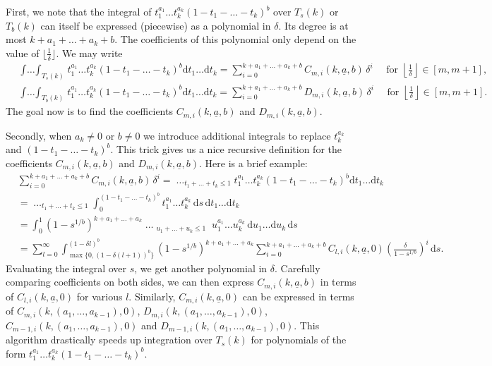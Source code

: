 \documentclass{amsart}
\numberwithin{equation}{section}
\begin{document}
\medskip  
 First, we note that the integral of $ t_1^{a_1} \dots t_k^{a_k} (1-t_1-\dots-t_k)^b$ over $T_s(k)$  or $T_b(k)$ can itself be expressed (piecewise) as a polynomial in $\delta$. Its degree is at most $k+a_1+\dots+a_k+b$. The coefficients of this polynomial only depend on the value of $\lfloor \frac{1}{\delta} \rfloor$. We may write
 \begin{align*}
 &\mathop{\int \dots \int }_{T_s (k)}    t_1^{a_1} \dots t_k^{a_k} (1-t_1-\dots-t_k)^b \mbox{d}t_1 \dots  \mbox{d}t_k = \sum_{i=0}^{k+a_1+\dots+a_k+b} C_{m,i}(k,\underline{a},b) \,\delta^i \quad \mbox{ for }  \left\lfloor \frac{1}{\delta} \right\rfloor \in [m,m+1], \\ 
  &\mathop{\int \dots \int }_{T_b (k)}    t_1^{a_1} \dots t_k^{a_k} (1-t_1-\dots-t_k)^b \mbox{d}t_1 \dots  \mbox{d}t_k = \sum_{i=0}^{k+a_1+\dots+a_k+b} D_{m,i}(k,\underline{a},b) \,\delta^i \quad \mbox{ for }  \left\lfloor \frac{1}{\delta} \right\rfloor \in [m,m+1].
 \end{align*}
 The goal  now is to find the coefficients $C_{m,i}(k,\underline{a},b)$ and $D_{m,i}(k,\underline{a},b)$. 
 
\medskip  
  Secondly, when $a_k \neq 0$ or $b \neq 0$  
 we introduce additional integrals to replace $t_k^{a_k}$ and $(1-t_1-\dots-t_k)^b$. This trick gives us  a nice recursive definition for the coefficients $C_{m,i}(k,\underline{a},b)$ and $D_{m,i}(k,\underline{a},b)$. Here is a brief example:
 \begin{align*}
 &\sum_{i=0}^{k+a_1+\dots+a_k+b} C_{m,i}(k,\underline{a},b) \, \delta^i  =\mathop{\int_0^\delta \dots \int_0^\delta}_{t_1 + \dots + t_k \leq 1}   t_1^{a_1} \dots t_k^{a_k} (1-t_1-\dots-t_k)^b \mbox{d}t_1 \dots  \mbox{d}t_k \\
 &= 
 \mathop{\int_0^\delta \dots \int_0^\delta}_{t_1 + \dots + t_k \leq 1} \int_{0}^{(1-t_1-\dots-t_k)^b}   t_1^{a_1} \dots t_{k}^{a_{k}}  \, \mbox{d}s \, \mbox{d}t_1 \dots  \mbox{d}t_k\\
 &= 
\int_{0}^{1}  (1 -s^{1/b} )^{k+ a_1+\dots + a_k} \mathop{\int_0^{\frac{\delta}{1 -s^{1/b} }}  \dots \int_0^{\frac{\delta}{1 -s^{1/b} }}}_{\substack{ u_1 + \dots + u_k \leq 1    }}   u_1^{a_1} \dots u_{k}^{a_{k}} \, \mbox{d}u_1 \dots  \mbox{d}u_k \, \mbox{d}s \\
&= \sum_{l=0}^\infty 
\int_{\max\{0,(1-\delta (l+1))^b\}}^{(1-\delta l)^b}  (1 -s^{1/b} )^{k+ a_1+\dots + a_k}   \sum_{i=0}^{k+a_1+\dots+a_k+b} C_{l,i}(k,\underline{a},0)\left(\frac{\delta}{1-s^{1/b}}\right)^i\, \mbox{d}s.
 \end{align*}
 Evaluating the integral over $s$, we get another polynomial in $\delta$. Carefully comparing coefficients on both sides, we can then express $C_{m,i}(k,\underline{a},b)$ in terms of $C_{l,i}(k,\underline{a},0)$ for various $l$. Similarly, $C_{m,i}(k,\underline{a},0)$ can be expressed in terms of $C_{m,i}(k,(a_1, \dots, a_{k-1}),0)$, $D_{m,i}(k,(a_1, \dots, a_{k-1}),0)$, $C_{m-1,i}(k,(a_1, \dots, a_{k-1}),0)$ and $D_{m-1,i}(k,(a_1, \dots, a_{k-1}),0)$. This algorithm drastically speeds up integration over $T_s(k)$ for polynomials of the form   $t_1^{a_1} \dots t_k^{a_k} (1-t_1-\dots-t_k)^b $.
\end{document}

